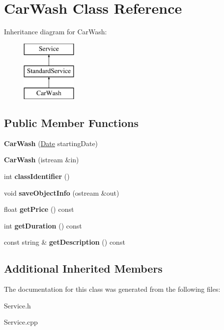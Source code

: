 \hypertarget{class_car_wash}{}\section{Car\+Wash Class Reference}
\label{class_car_wash}
Inheritance diagram for Car\+Wash\+:\begin{figure}[H]
\begin{center}
\leavevmode
\includegraphics[height=3.000000cm]{class_car_wash}
\end{center}
\end{figure}
\subsection*{Public Member Functions}
\begin{DoxyCompactItemize}
\item 
\hypertarget{class_car_wash_a0e62c97aa6ea66728c35b81a97134f41}{}{\bfseries Car\+Wash} (\hyperlink{struct_date}{Date} starting\+Date)\label{class_car_wash_a0e62c97aa6ea66728c35b81a97134f41}

\item 
\hypertarget{class_car_wash_a4b5fa2957227df1358df80fe38443635}{}{\bfseries Car\+Wash} (istream \&in)\label{class_car_wash_a4b5fa2957227df1358df80fe38443635}

\item 
\hypertarget{class_car_wash_a0cdc63c1e52c987640b11f6a1351dc46}{}int {\bfseries class\+Identifier} ()\label{class_car_wash_a0cdc63c1e52c987640b11f6a1351dc46}

\item 
\hypertarget{class_car_wash_a3bda9ff2a0335b9da7116286c65cb05f}{}void {\bfseries save\+Object\+Info} (ostream \&out)\label{class_car_wash_a3bda9ff2a0335b9da7116286c65cb05f}

\item 
\hypertarget{class_car_wash_ade6abea7ff6b2e733811d05e53903bf0}{}float {\bfseries get\+Price} () const \label{class_car_wash_ade6abea7ff6b2e733811d05e53903bf0}

\item 
\hypertarget{class_car_wash_a8ab92c44fbafe9ccadc8714aa580cece}{}int {\bfseries get\+Duration} () const \label{class_car_wash_a8ab92c44fbafe9ccadc8714aa580cece}

\item 
\hypertarget{class_car_wash_a0ff92bfd45f847986468b61ad3b1abd2}{}const string \& {\bfseries get\+Description} () const \label{class_car_wash_a0ff92bfd45f847986468b61ad3b1abd2}

\end{DoxyCompactItemize}
\subsection*{Additional Inherited Members}


The documentation for this class was generated from the following files\+:\begin{DoxyCompactItemize}
\item 
Service.\+h\item 
Service.\+cpp\end{DoxyCompactItemize}
